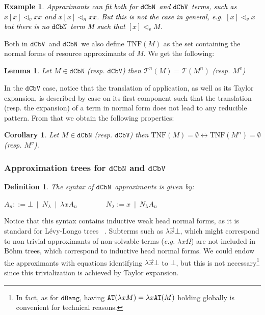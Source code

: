 \documentclass[10pt,a4paper]{article}
\newtheorem{lemma}[theorem]{Lemma}
\newtheorem{corollary}[theorem]{Corollary}
\newtheorem{definition}[theorem]{Definition}
\newtheorem{example}[theorem]{Example}
\newcommand{\<}{\langle}
\renewcommand{\>}{\rangle}
\newcommand{\alt}{~\mid~}
\newcommand{\dcbn}{\ensuremath{\mathtt{dCbN}}}
\newcommand{\dcbv}{\ensuremath{\mathtt{dCbV}}}
\newcommand{\dbang}{\ensuremath{\mathtt{dBang}}}
\newcommand{\tradv}[1]{\ensuremath{{#1}^v}}
\newcommand{\tradn}[1]{\ensuremath{{#1}^n}}
\newcommand{\appv}{\triangleleft_v} %
\newcommand{\appn}{\triangleleft_n} %
\newcommand{\taylor}[1]{\ensuremath{\mathcal{T}(#1)}}
\newcommand{\taylorn}[1]{\ensuremath{\mathcal{T}^n(#1)}}
\newcommand{\taylorv}[1]{\ensuremath{\mathcal{T}^v(#1)}}
\newcommand{\taylornf}[1]{\ensuremath{\text{TNF}(#1)}}
\newcommand{\bt}{\ensuremath{{\tt{AT}}}}
\newcommand{\fnl}[1]{\textcolor{black}{#1}}
\begin{document}
\begin{example}
	\fnl{
	Approximants can fit both for \dcbn\ and \dcbv\ terms, such as $x[x]\appv xx$ and
	$x[x]\appn xx$. But this is not the case in general, \emph{e.g.} $[x]\appv x$ but
	there is no \dcbn\ term $M$ such that $[x]\appv M$.
}
\end{example}
	
Both in \dcbv\ and \dcbn\, we also define $\taylornf{M}$ as the set
containing the normal forms of resource approximants of $M$. We get the following: 

\begin{lemma}
	\label{lem:taylor_trad_dcbn_dcbv}
	Let $M \in \dcbn$ (resp. $\dcbv$) then $\taylorn M = \taylor{\tradn M}$ (resp. $\tradv M$)
\end{lemma}

In the $\dcbv$ case, notice that the translation of application, as
well as its Taylor expansion, is described by case on its first
component such that the translation (resp. the expansion) of a term in
normal form does not lead to any reducible pattern.
From that we obtain the following properties:

\begin{corollary}\label{cor:tradn_tnf-tradv-tnf}
	Let $M\in\dcbn$ (resp. $\dcbv$) then $\taylornf
	M=\emptyset\leftrightarrow \taylornf{\tradn M}=\emptyset$ (resp. $\tradv M$).
\end{corollary}

\subsubsection{Approximation trees for \dcbn{} and \dcbv{}}

\begin{definition}The syntax of \dcbn\ approximants is given by:
\begin{center}
	$A_n ::=  \bot\alt N_{\lambda} \alt \lambda x A_n
	\qquad\qquad N_{\lambda } := x  \alt N_{\lambda } A_n$
\end{center}
\end{definition}
 
Notice that this syntax contains inductive weak head normal forms,  as it is standard for
Lévy-Longo trees ~\cite{Longo83}. Subterms such as $\lambda\vec x\bot$,
which might correspond to non trivial approximants of non-solvable terms (\emph{e.g.} $\lambda
x\Omega$) are not included in Böhm trees, which correspond to inductive head normal forms.  We could endow the approximants with equations identifying $\lambda\vec x\bot$
to $\bot$, but this is not necessary\footnote{
	In fact, as for \dbang, having $\bt(\lambda xM)=\lambda x\bt(M)$ holding globally is
	convenient for technical reasons.
}
since this trivialization is achieved by Taylor
expansion. %
\end{document}
